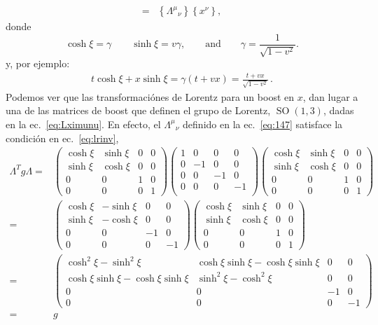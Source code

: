 \begin{frame}
\begin{align}
=&\left\{{\Lambda^\mu}_{\nu}\right\}\left\{x^\nu\right\},
\end{align}
donde
\begin{equation}
  \cosh\xi=\gamma\qquad\sinh\xi=v\gamma,\qquad\text{and}\qquad \gamma=\frac{1}{\sqrt{1-v^2}}.
\end{equation}
y, por ejemplo:
\begin{align}
  t\cosh{\xi}+x\sinh\xi=\gamma(t+v x)=\frac{t+v x}{\sqrt{1-v^2}}\,.
\end{align}
Podemos ver que las transformaciónes de Lorentz para un boost en $x$, dan lugar a una de las matrices de boost que definen el grupo de Lorentz, $\operatorname{SO}(1,3)$, dadas en la ec.~\eqref{eq:Lximunu}. En efecto, el ${\Lambda^\mu}_{\nu}$ definido en la ec.~\eqref{eq:147} satisface la condición en ec.~\eqref{eq:lrinv}, 
\begin{align}
  \Lambda^T g \Lambda=&\begin{pmatrix}
    \cosh\xi&\sinh\xi&0&0\\
    \sinh\xi&\cosh\xi&0&0\\
    0     &  0  &1&0\\
    0     &  0  &0&1
  \end{pmatrix}
  \begin{pmatrix}
    1 & 0  & 0 &0\\
    0 & -1 & 0 &0\\
    0 & 0  & -1&0\\
    0 & 0  & 0 &-1\\
  \end{pmatrix}
  \begin{pmatrix}
    \cosh\xi&\sinh\xi&0&0\\
    \sinh\xi&\cosh\xi&0&0\\
    0     &  0  &1&0\\
    0     &  0  &0&1
  \end{pmatrix}\nonumber\\
  =&\begin{pmatrix}
       \cosh\xi&-\sinh\xi&0&0\\
    \sinh\xi&-\cosh\xi&0&0\\
    0     &  0  &-1&0\\
    0     &  0  &0&-1
  \end{pmatrix}
 \begin{pmatrix}
    \cosh\xi&\sinh\xi&0&0\\
    \sinh\xi&\cosh\xi&0&0\\
    0     &  0  &1&0\\
    0     &  0  &0&1
  \end{pmatrix}\nonumber\\
  =&\begin{pmatrix}
       \cosh^2\xi-\sinh^2\xi&\cosh\xi\sinh\xi-\cosh\xi\sinh\xi&0&0\\
    \cosh\xi\sinh\xi-\cosh\xi\sinh\xi&\sinh^2\xi-\cosh^2\xi&0&0\\
    0     &  0  &-1&0\\
    0     &  0  &0&-1
  \end{pmatrix}\nonumber\\
=&g
\end{align}
\end{frame}

